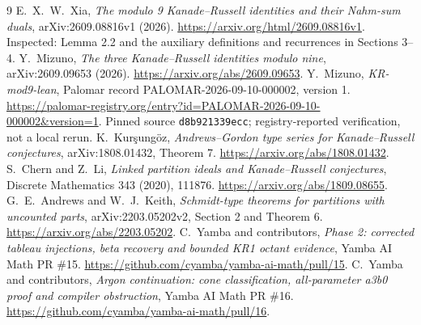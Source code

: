 \documentclass[11pt,a4paper]{article}
\theoremstyle{definition}
\begin{document}
\begin{thebibliography}{9}
E.\ X.\ W.\ Xia, \emph{The modulo 9 Kanade--Russell identities and their
Nahm-sum duals}, arXiv:2609.08816v1 (2026).
\url{https://arxiv.org/html/2609.08816v1}.
Inspected: Lemma 2.2 and the auxiliary definitions and recurrences in Sections 3--4.
Y.\ Mizuno, \emph{The three Kanade--Russell identities modulo nine},
arXiv:2609.09653 (2026).
\url{https://arxiv.org/abs/2609.09653}.
Y.\ Mizuno, \emph{KR-mod9-lean}, Palomar record
PALOMAR-2026-09-10-000002, version 1.
\url{https://palomar-registry.org/entry?id=PALOMAR-2026-09-10-000002&version=1}.
Pinned source \texttt{d8b921339ecc}; registry-reported verification, not a local rerun.
K.\ Kur\c{s}ung\"oz, \emph{Andrews--Gordon type series for Kanade--Russell
conjectures}, arXiv:1808.01432, Theorem 7.
\url{https://arxiv.org/abs/1808.01432}.
S.\ Chern and Z.\ Li, \emph{Linked partition ideals and Kanade--Russell
conjectures}, Discrete Mathematics 343 (2020), 111876.
\url{https://arxiv.org/abs/1809.08655}.
G.\ E.\ Andrews and W.\ J.\ Keith, \emph{Schmidt-type theorems for partitions
with uncounted parts}, arXiv:2203.05202v2, Section 2 and Theorem 6.
\url{https://arxiv.org/abs/2203.05202}.
C.\ Yamba and contributors, \emph{Phase 2: corrected tableau injections,
beta recovery and bounded KR1 octant evidence}, Yamba AI Math PR \#15.
\url{https://github.com/cyamba/yamba-ai-math/pull/15}.
C.\ Yamba and contributors, \emph{Argon continuation: cone classification,
all-parameter a3b0 proof and compiler obstruction}, Yamba AI Math PR \#16.
\url{https://github.com/cyamba/yamba-ai-math/pull/16}.
\end{thebibliography}
\end{document}
